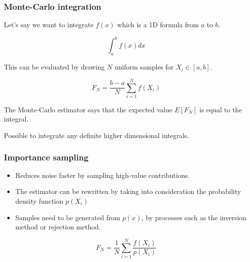 \documentclass{beamer}
\begin{document}
  \begin{frame}
    \frametitle{Monte-Carlo integration}
    
    Let's say we want to integrate $f(x)$ which is a  1D formula from $a$ to $b$.
    
    \begin{equation}
    \int_a^b f(x) dx
    \end{equation}
    
	This can be evaluated by drawing $N$ uniform samples for $X_i \in [a, b]$.
    
    \begin{equation}
    F_N = \frac{b-a}{N} \sum^N_{i=1} f(X_i)
    \end{equation}
    
    The Monte-Carlo estimator says that the expected value $E[F_N]$ is equal to the integral.
    
    Possible to integrate any definite higher dimensional integrals.
    
  \end{frame}
  
  \begin{frame}
    \frametitle{Importance sampling}
    
    \begin{itemize}
    \item Reduces noise faster by sampling high-value contributions.
    
    \item The estimator can be rewritten by taking into consideration the probability density function $p(X_i)$
    
    \item Samples need to be generated from $p(x)$, by processes such as the inversion method or rejection method.
    
    \end{itemize}
    
     \begin{equation}
    F_N = \frac{1}{N} \sum^N_{i=1} \frac{f(X_i)}{p(X_i)}
    \end{equation}
    
  \end{frame}
  
\end{document}
